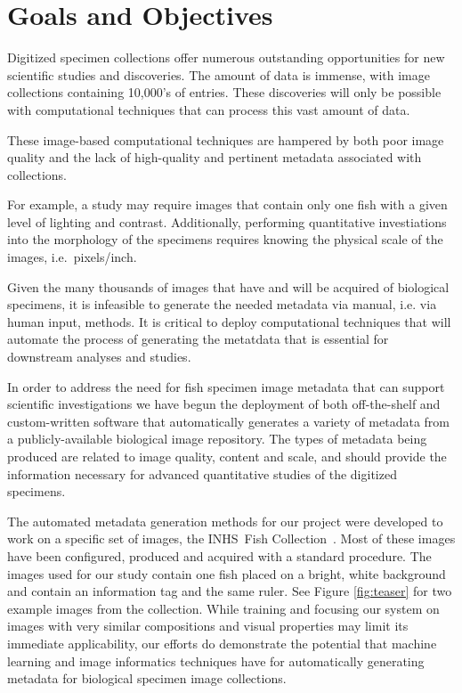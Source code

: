 \documentclass[conference]{IEEEtran}
\begin{document}
\section{Goals and Objectives}

Digitized specimen collections offer numerous outstanding opportunities
for new scientific studies and discoveries.
The amount of data is immense, with image collections containing 10,000's
of entries. These discoveries will only be possible
with computational techniques that can process this vast amount of data.

These image-based computational techniques are hampered by both poor
image quality and the lack of high-quality and pertinent metadata
associated with collections.

For example, a study may require images that contain only one fish with a
given level of lighting and contrast. Additionally, performing quantitative
investiations into the morphology of the specimens requires knowing
the physical scale of the images, i.e.~pixels/inch.

Given the many thousands of images that have and will be acquired of
biological specimens, it is infeasible to generate the needed metadata
via manual, i.e. via human input, methods.  It is critical to deploy
computational techniques that will automate the process of generating
the metatdata that is essential for downstream analyses and studies.

In order to address the need for fish specimen image metadata that can
support scientific investigations we have begun the deployment of
both off-the-shelf and custom-written software that automatically
generates a variety of metadata from a publicly-available biological
image repository.  The types of metadata being produced are related
to image quality, content and scale, and should provide the information
necessary for advanced quantitative studies of the digitized specimens.

The automated metadata generation methods for our project were developed
to work on a specific set of images, the INHS\ Fish
Collection~\cite{INHS}.  Most of these images have been configured,
produced and acquired with a standard procedure.  The images used for
our study contain one fish placed on a bright, white background and
contain an information tag and the same ruler.  See
Figure \ref{fig:teaser} for two example images from the collection.
While training and focusing our system on images with very similar
compositions and visual properties may limit its immediate applicability,
our efforts do demonstrate the potential that machine learning and
image informatics techniques have for automatically generating metadata
for biological specimen image collections.
\end{document}
